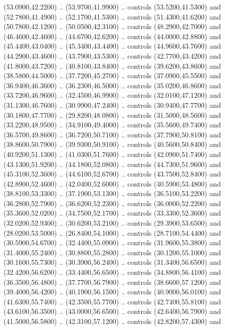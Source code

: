{\begin{scope}[y=0.80pt, x=0.80pt, yscale=-1, xscale=1, inner sep=0pt, outer sep=0pt, #1]
      (53.0900,42.2200) .. (53.9700,41.9900) .. controls (53.5200,41.5300) and
      (52.7800,41.4900) .. (52.1700,41.5300) .. controls (51.4300,41.6200) and
      (50.7800,42.1200) .. (50.0500,42.3100) .. controls (48.2900,42.7000) and
      (46.4600,42.4600) .. (44.6700,42.6200) .. controls (44.0000,42.8800) and
      (45.4400,43.0400) .. (45.3400,43.4400) .. controls (44.9600,43.7600) and
      (44.2900,43.4600) .. (43.7900,43.5300) .. controls (42.7700,43.4200) and
      (41.8000,43.7200) .. (40.8100,43.8400) .. controls (39.6200,43.8600) and
      (38.5800,44.5000) .. (37.7200,45.2700) .. controls (37.0900,45.5500) and
      (36.9400,46.3600) .. (36.2300,46.5000) .. controls (35.0200,46.8600) and
      (33.7200,46.9600) .. (32.4500,46.9900) .. controls (32.0100,47.1200) and
      (31.1300,46.7600) .. (30.9900,47.2400) .. controls (30.9400,47.7700) and
      (30.1800,47.7700) .. (29.8200,48.0800) .. controls (31.5000,48.5600) and
      (33.2200,48.9500) .. (34.9100,49.4000) .. controls (35.5600,49.7400) and
      (36.5700,49.8600) .. (36.7200,50.7100) .. controls (37.7900,50.8100) and
      (38.8600,50.7900) .. (39.9300,50.9100) .. controls (40.5600,50.8400) and
      (40.9200,51.1300) .. (41.0300,51.7600) .. controls (42.0900,51.7400) and
      (43.1300,51.9200) .. (44.1800,52.0800) .. controls (44.7300,51.9600) and
      (45.3100,52.3600) .. (44.6100,52.6700) .. controls (43.7500,52.8400) and
      (42.8900,52.4600) .. (42.0400,52.6000) .. controls (40.5900,53.4800) and
      (38.8100,53.3300) .. (37.1900,53.1300) .. controls (36.5100,53.2200) and
      (36.2800,52.7900) .. (36.6200,52.2300) .. controls (36.0000,52.2200) and
      (35.3600,52.0200) .. (34.7500,52.1700) .. controls (33.3300,52.3600) and
      (32.0200,52.9300) .. (30.6200,53.2100) .. controls (29.3900,53.6500) and
      (28.0200,53.5000) .. (26.8400,54.1000) .. controls (28.7100,54.4400) and
      (30.5900,54.6700) .. (32.4400,55.0900) .. controls (31.9600,55.3800) and
      (31.4000,55.2400) .. (30.8800,55.2800) .. controls (30.1200,55.1000) and
      (30.1600,55.7300) .. (30.3900,56.2400) .. controls (31.3400,56.6500) and
      (32.4200,56.6200) .. (33.4400,56.6500) .. controls (34.8800,56.4100) and
      (36.3500,56.4800) .. (37.7700,56.7900) .. controls (38.6600,57.1200) and
      (39.4000,56.4200) .. (40.1900,56.1500) .. controls (40.9000,56.0100) and
      (41.6300,55.7400) .. (42.3500,55.7700) .. controls (42.7400,55.8100) and
      (43.6100,56.3500) .. (43.0000,56.6500) .. controls (42.6400,56.7900) and
      (41.5000,56.5800) .. (42.3100,57.1200) .. controls (42.8200,57.4300) and

\end{scope}}
